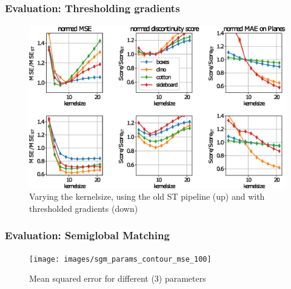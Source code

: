 \documentclass[11pt]{beamer}
\begin{document}
\begin{frame}
\frametitle{ Evaluation: Thresholding gradients}
\begin{figure}
	\centering
	\includegraphics[width=1\linewidth]{images/old_outer}
	\caption[Varying kernelsize]{Varying the kernelsize, using the old ST pipeline (up) and with thresholded gradients (down)}
	\label{fig:oldouter}
\end{figure}
\end{frame}

\begin{frame}
\frametitle{Evaluation: Semiglobal Matching}
\begin{figure}
	\centering
	\texttt{[image: images/sgm\_params\_contour\_mse\_100]}
	\caption[mse_100]{Mean squared error for different (3) parameters}
	\label{fig:sgmparamscontourmse100}
\end{figure}
\end{frame}
\end{document}
